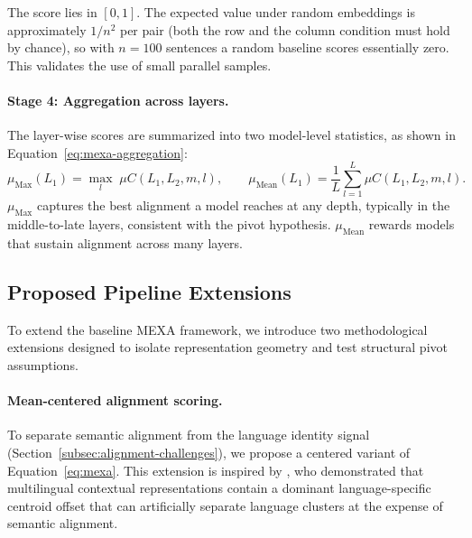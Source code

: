 The score lies in $[0, 1]$. The expected value under random embeddings is approximately $1/n^2$ per pair (both the row and the column condition must hold by chance), so with $n = 100$ sentences a random baseline scores essentially zero. This validates the use of small parallel samples.

\paragraph{Stage 4: Aggregation across layers.}
The layer-wise scores are summarized into two model-level statistics, as shown in Equation~\eqref{eq:mexa-aggregation}:
\begin{equation}
    \mu_{\text{Max}}(L_1) = \max_{l} \; \mu C(L_1, L_2, m, l),
    \qquad
    \mu_{\text{Mean}}(L_1) = \frac{1}{L} \sum_{l=1}^{L} \mu C(L_1, L_2, m, l).
    \label{eq:mexa-aggregation}
\end{equation}
$\mu_{\text{Max}}$ captures the best alignment a model reaches at any depth, typically in the middle-to-late layers, consistent with the pivot hypothesis. $\mu_{\text{Mean}}$ rewards models that sustain alignment across many layers.

\subsection{Proposed Pipeline Extensions}
\label{subsec:pipeline-extensions}

To extend the baseline MEXA framework, we introduce two methodological extensions designed to isolate representation geometry and test structural pivot assumptions.

\paragraph{Mean-centered alignment scoring.}
To separate semantic alignment from the language identity signal (Section~\ref{subsec:alignment-challenges}), we propose a centered variant of Equation~\eqref{eq:mexa}. This extension is inspired by \citet{schuster2019crosslingual}, who demonstrated that multilingual contextual representations contain a dominant language-specific centroid offset that can artificially separate language clusters at the expense of semantic alignment.

